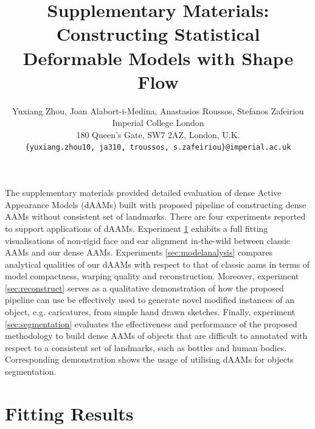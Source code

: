 






\title{Supplementary Materials: Constructing Statistical Deformable Models with Shape Flow}

\author{Yuxiang Zhou, Joan Alabort-i-Medina, Anastasios Roussos, Stefanos Zafeiriou\\
Imperial College London\\
180 Queen’s Gate, SW7 2AZ, London, U.K.\\
{\tt\small \{yuxiang.zhou10, ja310, troussos, s.zafeiriou\}@imperial.ac.uk}}
\maketitle
\thispagestyle{empty}

The supplementary materials provided detailed evaluation of dense Active Appearance Models (dAAMs) built with proposed pipeline of constructing dense AAMs without consistent set of landmarks. There are four experiments reported to support applications of dAAMs. Experiment \ref{sec:fittingresults} exhibits a full fitting visualisations of non-rigid face and ear alignment in-the-wild between classic AAMs and our dense AAMs. Experiments \ref{sec:modelanalysis} compares analytical qualities of our dAAMs with respect to that of classic aams in terms of model compactness, warping quality and reconstruction.
Moreover, experiment \ref{sec:reconstruct} serves as a qualitative demonstration of how the proposed pipeline can use be effectively used to generate novel modified instances of an object, e.g. caricatures, from simple hand drawn sketches.
Finally, experiment \ref{sec:segmentation} evaluates the effectiveness and performance of the proposed methodology to build dense AAMs of objects that are difficult to annotated with respect to a consistent set of landmarks, such as bottles and human bodies. Corresponding demonstration shows the usage of utilising dAAMs for objects segmentation.

\appendix
\section{Fitting Results}
\label{sec:fittingresults}

